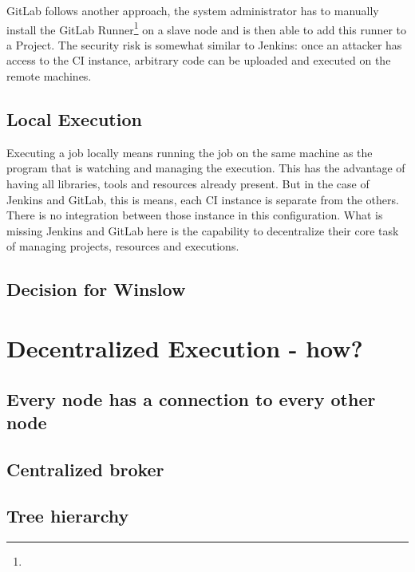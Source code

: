 
GitLab follows another approach, the system administrator has to manually install the GitLab Runner\footnote{} on a slave node and is then able to add this runner to a Project.
The security risk is somewhat similar to Jenkins: once an attacker has access to the CI instance, arbitrary code can be uploaded and executed on the remote machines. 


\subsection{Local Execution}

Executing a job locally means running the job on the same machine as the program that is watching and managing the execution.
This has the advantage of having all libraries, tools and resources already present.
But in the case of Jenkins and GitLab, this is means, each CI instance is separate from the others.
There is no integration between those instance in this configuration.
What is missing Jenkins and GitLab here is the capability to decentralize their core task of managing projects, resources and executions.


\subsection{Decision for Winslow}




\section{Decentralized Execution - how?}


\subsection{Every node has a connection to every other node}

\subsection{Centralized broker}

\subsection{Tree hierarchy}

